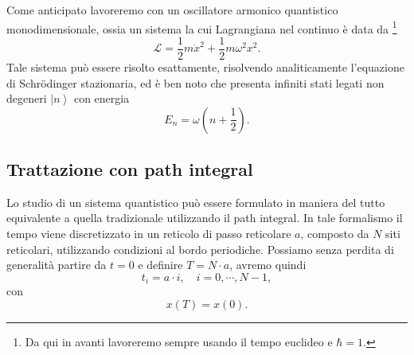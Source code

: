 \documentclass{article}
\begin{document}
 Come anticipato lavoreremo con un oscillatore armonico quantistico monodimensionale, ossia un sistema la cui Lagrangiana nel continuo è data da \footnote{Da qui in avanti lavoreremo sempre usando il tempo euclideo e $\hbar=1$.}
\begin{equation}
    \mathcal{L}=\frac{1}{2}m\dot{x}^2+\frac{1}{2}m\omega^2x^2.
\end{equation}
Tale sistema può essere risolto esattamente, risolvendo analiticamente l'equazione di Schrödinger stazionaria, ed è ben noto che presenta infiniti stati legati non degeneri $\left|n\right>$ con energia 
\begin{equation}
    E_n=\omega\left(n+\frac{1}{2}\right).
\end{equation}

\subsection{Trattazione con path integral}


Lo studio di un sistema quantistico può essere formulato in maniera del tutto equivalente a quella tradizionale utilizzando il path integral. In tale formalismo il tempo viene discretizzato in un reticolo di passo reticolare $a$, composto da $N$ siti reticolari, utilizzando condizioni al bordo periodiche. Possiamo senza perdita di generalità partire da $t=0$ e definire $T=N\cdot a$, avremo quindi 
\begin{equation}
    t_i=a\cdot i, \,\,\,\,\,\, i=0,\cdots, N-1, 
\end{equation}
con 
\begin{equation}
    x(T)=x(0).
\end{equation}
\end{document}

